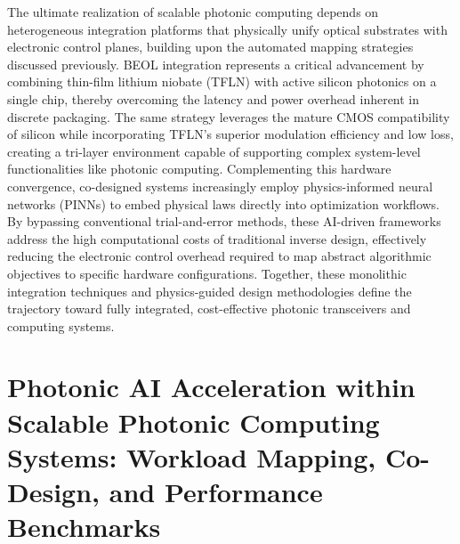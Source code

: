 The ultimate realization of scalable photonic computing depends on heterogeneous integration platforms that physically unify optical substrates with electronic control planes, building upon the automated mapping strategies discussed previously. BEOL integration represents a critical advancement by combining thin-film lithium niobate (TFLN) with active silicon photonics on a single chip, thereby overcoming the latency and power overhead inherent in discrete packaging. The same strategy leverages the mature CMOS compatibility of silicon while incorporating TFLN's superior modulation efficiency and low loss, creating a tri-layer environment capable of supporting complex system-level functionalities like photonic computing. Complementing this hardware convergence, co-designed systems increasingly employ physics-informed neural networks (PINNs) to embed physical laws directly into optimization workflows. By bypassing conventional trial-and-error methods, these AI-driven frameworks address the high computational costs of traditional inverse design, effectively reducing the electronic control overhead required to map abstract algorithmic objectives to specific hardware configurations. Together, these monolithic integration techniques and physics-guided design methodologies define the trajectory toward fully integrated, cost-effective photonic transceivers and computing systems. \citep{s2_9b444e84d20ae6e3d62d2d4df30268b5a53baad2_40af2cc9} \citep{s2_037e66f37189104d61c0d000de0cee202b7eec9e_d15b8018}

\section{Photonic AI Acceleration within Scalable Photonic Computing Systems: Workload Mapping, Co-Design, and Performance Benchmarks}\label{photonic-ai-acceleration-within-scalable-photonic-computing-systems-workload-mapping-co-design-and-performance-benchmarks}


